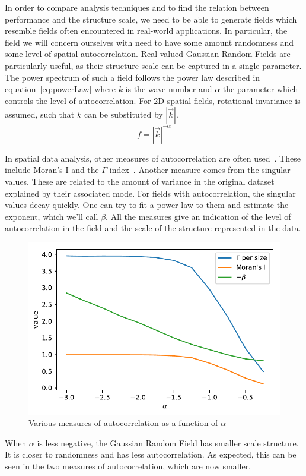 \documentclass{acm_proc_article-sp}
\begin{document}
In order to compare analysis techniques and to find the relation between performance and the structure scale, we need to be able to generate fields which resemble fields often encountered in real-world applications. In particular, the field we will concern ourselves with need to have some amount randomness and some level of spatial autocorrelation. Real-valued Gaussian Random Fields are particularly useful, as their structure scale can be captured in a single parameter. The power spectrum of such a field follows the power law described in equation~\ref{eq:powerLaw} where $k$ is the wave number and $\alpha$ the parameter which controls the level of autocorrelation. For 2D spatial fields, rotational invariance is assumed, such that $k$ can be substituted by $|\vec{k}|$.
\begin{equation}
\label{eq:powerLaw}
f = |\vec{k}|^{-\alpha}
\end{equation}

In spatial data analysis, other measures of autocorrelation are often used~\cite{Eshel2011, Storch1999}. These include Moran's I and the $\Gamma$ index~\cite{Moran1950, Hubert1981, PySAL}. Another measure comes from the singular values. These are related to the amount of variance in the original dataset explained by their associated mode. For fields with autocorrelation, the singular values decay quickly. One can try to fit a power law to them and estimate the exponent, which we'll call $\beta$. %
All the measures give an indication of the level of autocorrelation in the field and the scale of the structure represented in the data.

\begin{figure}[h]
\begin{center}
\includegraphics[width=0.8\columnwidth]{Results/plotGammaAndMoransIAndBeta.pdf}
\caption[Various measures of autocorrelation]{Various measures of autocorrelation as a function of $\alpha$}
\label{fig:plotGammaAndMoransIAndBeta}
\end{center}
\end{figure}
When $\alpha$ is less negative, the Gaussian Random Field has smaller scale structure. It is closer to randomness and has less autocorrelation. As expected, this can be seen in the two measures of autocorrelation, which are now smaller.
\end{document}
